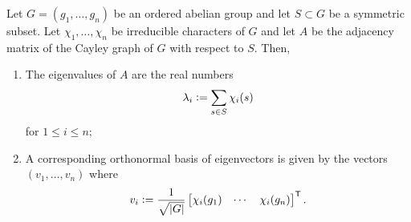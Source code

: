 \begin{thm} \label{thm:adjcayleyeigen}
    Let $G = (g_1, \ldots, g_n)$ be an ordered abelian group and let $S \subset G$ be a symmetric subset. Let $\chi_1, \ldots, \chi_n$ be irreducible characters of $G$ and let $A$ be the adjacency matrix of the Cayley graph of $G$ with respect to $S.$ Then,
    \begin{enumerate}
        \item The eigenvalues of $A$ are the real numbers
        \begin{equation*} 
            \lambda_i \vcentcolon= \sum_{s \in S} \chi_i(s)
        \end{equation*}
        for $1 \le i \le n;$
        \item A corresponding orthonormal basis of eigenvectors is given by the vectors $(v_1, \ldots, v_n)$ where
        \begin{equation*} 
            v_i \vcentcolon= \frac{1}{\sqrt{{\left\lvert G \right\lvert}}} \begin{bmatrix}
                \chi_i(g_1) & \cdots & \chi_i(g_n)
            \end{bmatrix}^\mathsf{T}.
        \end{equation*}
    \end{enumerate}
\end{thm}

